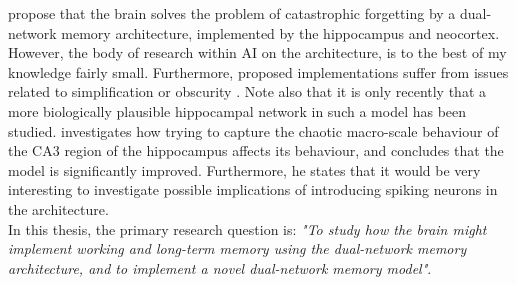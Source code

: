 \citet{McClelland1995} propose that the brain solves the problem of catastrophic forgetting by a dual-network memory architecture, implemented by the hippocampus and neocortex. However, the body of research within AI on the architecture, is to the best of my knowledge fairly small. Furthermore, proposed implementations suffer from issues related to simplification or obscurity \citep{French1997, French2001, Hattori2010, Hattori2014}. Note also that it is only recently that a more biologically plausible hippocampal network in such a model has been studied. \citet{Hattori2014} investigates how trying to capture the chaotic macro-scale behaviour of the CA3 region of the hippocampus affects its behaviour, and concludes that the model is significantly improved. Furthermore, he states that it would be very interesting to investigate possible implications of introducing spiking neurons in the architecture.
\\

In this thesis, 
the primary research question is: \textit{"To study how the brain might implement working and long-term memory using the dual-network memory architecture, and to implement a novel dual-network memory model"}.
\\


